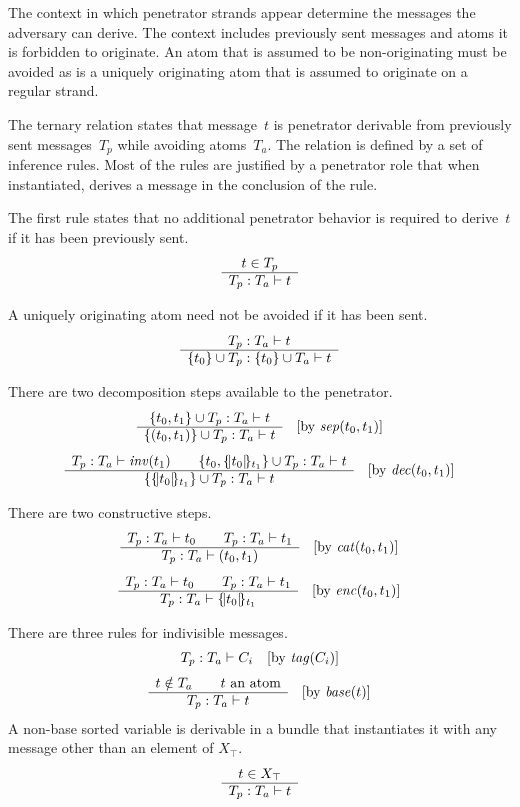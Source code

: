 \documentclass[12pt]{article}
\theoremstyle{definition}
\begin{document}
The context in which penetrator strands appear determine the messages
the adversary can derive.  The context includes previously sent
messages and atoms it is forbidden to originate.  An atom that is
assumed to be non-originating must be avoided as is a uniquely
originating atom that is assumed to originate on a regular strand.

The ternary relation  states that message~$t$ is
penetrator derivable from previously sent messages~$T_p$ while
avoiding atoms~$T_a$.  The relation is defined by a set of inference
rules.  Most of the rules are justified by a penetrator role that when
instantiated, derives a message in the conclusion of the rule.

The first rule states that no additional penetrator behavior is required
to derive~$t$ if it has been previously sent.
$$\infer{t\in{T_p}}{\der{t}{T_p}{T_a}}$$

A uniquely originating atom need not be avoided if it has been sent.
\begin{equation}\label{eqn:avoid}
\infer{\der{t}{T_p}{T_a}}%
{\der{t}{\{t_0\}\cup T_p}{\{t_0\}\cup T_a}}
\end{equation}

There are two decomposition steps available to the penetrator.
\begin{equation}\label{eqn:sep}
\infer{\der{t}{\{t_0,t_1\}\cup T_p}{T_a}}%
{\der{t}{\{(t_0,t_1)\}\cup T_p}{T_a}}\quad
[\mbox{by $\fn{sep}(t_0,t_1)$}]
\end{equation}
\begin{equation}\label{eqn:dec}
\infer{\der{\fn{inv}(t_1)}{T_p}{T_a}\qquad
\der{t}{\{t_0,\enc{t_0}{t_1}\}\cup T_p}{T_a}}%
{\der{t}{\{\enc{t_0}{t_1}\}\cup T_p}{T_a}}\quad
[\mbox{by $\fn{dec}(t_0,t_1)$}]
\end{equation}

There are two constructive steps.
$$\infer{\der{t_0}{T_p}{T_a}\qquad\der{t_1}{T_p}{T_a}}%
{\der{(t_0,t_1)}{T_p}{T_a}}\quad
[\mbox{by $\fn{cat}(t_0,t_1)$}]$$
$$\infer{\der{t_0}{T_p}{T_a}\qquad\der{t_1}{T_p}{T_a}}%
{\der{\enc{t_0}{t_1}}{T_p}{T_a}}\quad
[\mbox{by $\fn{enc}(t_0,t_1)$}]$$

There are three rules for indivisible messages.
$$\der{C_i}{T_p}{T_a}\quad
[\mbox{by $\fn{tag}(C_i)$}]$$
$$\infer{t\notin T_a\qquad\mbox{$t$ an atom}}%
{\der{t}{T_p}{T_a}}\quad
[\mbox{by $\fn{base}(t)$}]$$
A non-base sorted variable is derivable in a bundle that instantiates
it with any message other than an element of $X_\top$.
$$\infer{t\in X_\top}{\der{t}{T_p}{T_a}}$$
\end{document}
